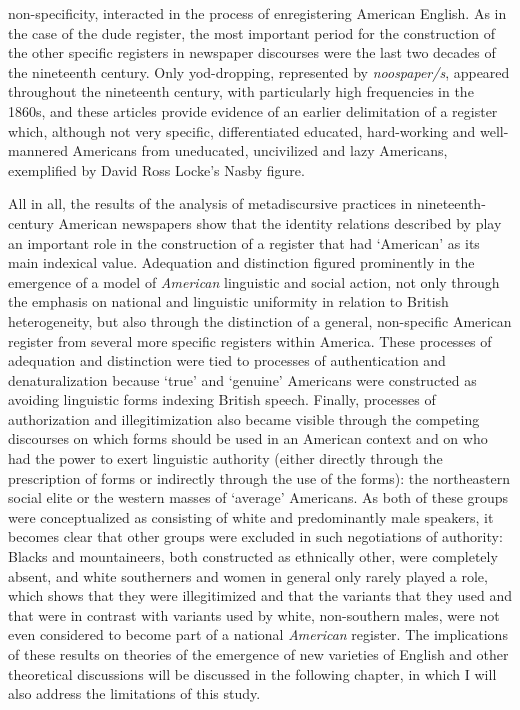 non-specificity, interacted in the process of enregistering American English. As in the case of the dude register, the most important period for the construction of the other specific registers in newspaper discourses were the last two decades of the nineteenth century. Only yod-dropping, represented by \emph{noospaper/s}, appeared throughout the nineteenth century, with particularly high frequencies in the 1860s, and these articles provide evidence of an earlier delimitation of a register which, although not very specific, differentiated educated, hard-working and well-mannered Americans from uneducated, uncivilized and lazy Americans, exemplified by David Ross Locke’s Nasby figure.


All in all, the results of the analysis of metadiscursive practices in nineteenth-century American newspapers show that the identity relations described by \citet{Bucholtz2005} play an important role in the construction of a register that had ‘American’ as its main indexical value. Adequation and distinction figured prominently in the emergence of a model of \textit{American} linguistic and social action, not only through the emphasis on national and linguistic uniformity in relation to British heterogeneity, but also through the distinction of a general, non-specific American register from several more specific registers within America. These processes of adequation and distinction were tied to processes of authentication and denaturalization because ‘true’ and ‘genuine’ Americans were constructed as avoiding linguistic forms indexing British speech. Finally, processes of authorization and illegitimization also became visible through the competing discourses on which forms should be used in an American context and on who had the power to exert linguistic authority (either directly through the prescription of forms or indirectly through the use of the forms): the northeastern social elite or the western masses of ‘average’ Americans. As both of these groups were conceptualized as consisting of white and predominantly male speakers, it becomes clear that other groups were excluded in such negotiations of authority: Blacks and mountaineers, both constructed as ethnically other, were completely absent, and white southerners and women in general only rarely played a role, which shows that they were illegitimized and that the variants that they used and that were in contrast with variants used by white, non-southern males, were not even considered to become part of a national \textit{American} register. The implications of these results on theories of the emergence of new varieties of English and other theoretical discussions will be discussed in the following chapter, in which I will also address the limitations of this study.

